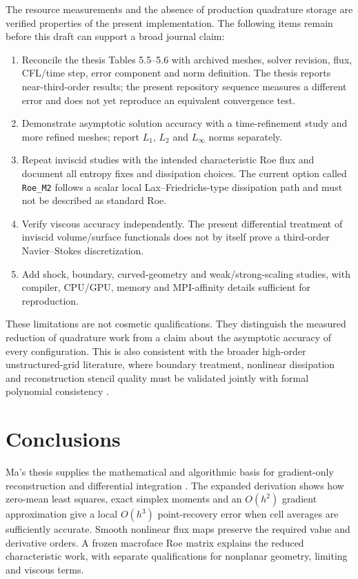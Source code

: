 \documentclass[11pt]{article}
\begin{document}
The resource measurements and the absence of production quadrature storage are verified properties of the present implementation.  The following items remain before this draft can support a broad journal claim:
\begin{enumerate}
  \item Reconcile the thesis Tables 5.5--5.6 with archived meshes, solver revision, flux, CFL/time step, error component and norm definition.  The thesis reports near-third-order results; the present repository sequence measures a different error and does not yet reproduce an equivalent convergence test.
  \item Demonstrate asymptotic solution accuracy with a time-refinement study and more refined meshes; report $L_1$, $L_2$ and $L_\infty$ norms separately.
  \item Repeat inviscid studies with the intended characteristic Roe flux and document all entropy fixes and dissipation choices.  The current option called \texttt{Roe\_M2} follows a scalar local Lax--Friedrichs-type dissipation path and must not be described as standard Roe.
  \item Verify viscous accuracy independently.  The present differential treatment of inviscid volume/surface functionals does not by itself prove a third-order Navier--Stokes discretization.
  \item Add shock, boundary, curved-geometry and weak/strong-scaling studies, with compiler, CPU/GPU, memory and MPI-affinity details sufficient for reproduction.
\end{enumerate}

These limitations are not cosmetic qualifications.  They distinguish the measured reduction of quadrature work from a claim about the asymptotic accuracy of every configuration.  This is also consistent with the broader high-order unstructured-grid literature, where boundary treatment, nonlinear dissipation and reconstruction stencil quality must be validated jointly with formal polynomial consistency \cite{wang2007review,chen2022,setzwein2021}.

\section{Conclusions}\label{sec:conclusion}

Ma's thesis supplies the mathematical and algorithmic basis for gradient-only reconstruction and differential integration \cite{ma2026thesis}.  The expanded derivation shows how zero-mean least squares, exact simplex moments and an $O(h^2)$ gradient approximation give a local $O(h^3)$ point-recovery error when cell averages are sufficiently accurate.  Smooth nonlinear flux maps preserve the required value and derivative orders.  A frozen macroface Roe matrix explains the reduced characteristic work, with separate qualifications for nonplanar geometry, limiting and viscous terms.
\end{document}
